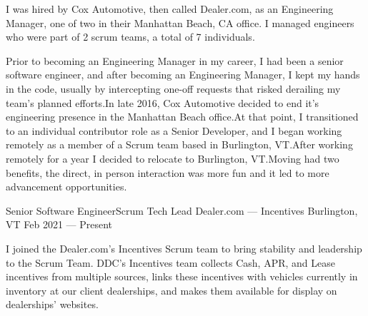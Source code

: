 

\begin{cvparagraph}
I was hired by Cox Automotive, then called Dealer.com, as an
Engineering Manager, one of two in their Manhattan Beach, CA office.
I managed engineers who were part of 2 scrum teams, a total of 7
individuals.
\end{cvparagraph}

\vspace{-1.00mm}

\begin{cvparagraph}
Prior to becoming an Engineering Manager in my career, I had been a
senior software engineer, and after becoming an Engineering Manager, I kept my
hands in the code, usually by intercepting one-off requests that
risked derailing my team's planned efforts.\@ In late 2016, Cox
Automotive decided to end it's engineering presence in the Manhattan
Beach office.\@ At that point, I transitioned to an individual contributor role as a
Senior Developer, and I began working remotely as a member of a Scrum team based
in Burlington, VT.\@ After working remotely for a year I decided to
relocate to Burlington, VT.\@ Moving had two benefits, the direct, in
person interaction was more fun and it led to more advancement opportunities.
\end{cvparagraph}


\begin{cventries}
  \cventry
    {Senior Software Engineer{\enskip\cdotp\enskip}Scrum Tech Lead} %
    {Dealer.com --- Incentives} %
    {Burlington, VT} %
    {Feb 2021 --- Present} %
    {}
\end{cventries}
\vspace{-6.00mm}

\begin{cvparagraph}
I joined the Dealer.com's Incentives Scrum team to bring stability and leadership to the Scrum Team.
DDC's Incentives team collects Cash, APR, and Lease incentives from multiple sources,
links these incentives with vehicles currently in inventory at our client dealerships,
and makes them available for display on dealerships' websites.
\end{cvparagraph}

